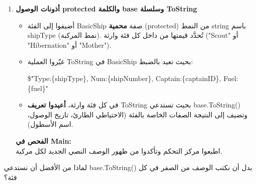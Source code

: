 \documentclass[14pt]{extarticle}
\begin{document}
\begin{enumerate}[resume, label=\textbf{تمرين \arabic*:}, wide=0pt, leftmargin=*, itemsep=2.2em]
    \item \textbf{أذونات الوصول \textenglish{protected} والكلمة \textenglish{base} وسلسلة \textenglish{ToString}}
    \begin{itemize}
        \item أضيفوا إلى الفئة \textenglish{BasicShip} صفة \textbf{محمية} (\textenglish{protected}) من النمط \textenglish{string} باسم \textenglish{shipType} (نمط المركبة). تُحدَّد قيمتها من داخل كل فئة وارثة (\textenglish{"Scout"} أو \textenglish{"Hibernation"} أو \textenglish{"Mother"}).
        \item غيّروا العملية \textenglish{ToString} في \textenglish{BasicShip} بحيث تعيد بالضبط:
        \begin{center}
        \textenglish{\$"Type:\{shipType\}, Num:\{shipNumber\}, Captain:\{captainID\}, Fuel:\{fuel\}"}
        \end{center}
        \item في كل فئة وارثة، \textbf{أعيدوا تعريف} \textenglish{ToString} بحيث تستدعي \textenglish{base.ToString()} وتضيف إلى النتيجة الصفات الخاصة بالفئة (الاحتياطي الطارئ، تاريخ الوصول، اسم الأسطول).
    \end{itemize}
    \textbf{الفحص في \textenglish{Main}:} \\
    اطبعوا مركز التحكم وتأكدوا من ظهور الوصف النصي الجديد لكل مركبة.

\end{enumerate}

\begin{boxAttention}
لماذا من الأفضل أن نستدعي \textenglish{base.ToString()} بدل أن نكتب الوصف من الصفر في كل فئة؟
\end{boxAttention}

\clearpage
\end{document}
